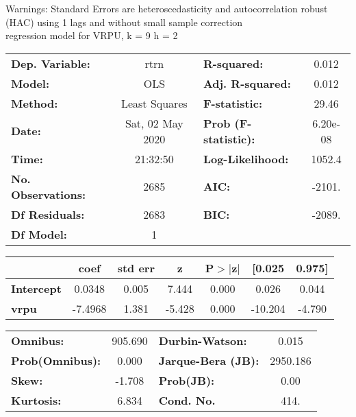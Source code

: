Warnings: \newline
 [1] Standard Errors are heteroscedasticity and autocorrelation robust (HAC) using 1 lags and without small sample correction\\ 

regression model for VRPU, k = 9 h = 2\begin{center}
\begin{tabular}{lclc}
\toprule
\textbf{Dep. Variable:}    &       rtrn       & \textbf{  R-squared:         } &     0.012   \\
\textbf{Model:}            &       OLS        & \textbf{  Adj. R-squared:    } &     0.012   \\
\textbf{Method:}           &  Least Squares   & \textbf{  F-statistic:       } &     29.46   \\
\textbf{Date:}             & Sat, 02 May 2020 & \textbf{  Prob (F-statistic):} &  6.20e-08   \\
\textbf{Time:}             &     21:32:50     & \textbf{  Log-Likelihood:    } &    1052.4   \\
\textbf{No. Observations:} &        2685      & \textbf{  AIC:               } &    -2101.   \\
\textbf{Df Residuals:}     &        2683      & \textbf{  BIC:               } &    -2089.   \\
\textbf{Df Model:}         &           1      & \textbf{                     } &             \\
\bottomrule
\end{tabular}
\begin{tabular}{lcccccc}
                   & \textbf{coef} & \textbf{std err} & \textbf{z} & \textbf{P$> |$z$|$} & \textbf{[0.025} & \textbf{0.975]}  \\
\midrule
\textbf{Intercept} &       0.0348  &        0.005     &     7.444  &         0.000        &        0.026    &        0.044     \\
\textbf{vrpu}      &      -7.4968  &        1.381     &    -5.428  &         0.000        &      -10.204    &       -4.790     \\
\bottomrule
\end{tabular}
\begin{tabular}{lclc}
\textbf{Omnibus:}       & 905.690 & \textbf{  Durbin-Watson:     } &    0.015  \\
\textbf{Prob(Omnibus):} &   0.000 & \textbf{  Jarque-Bera (JB):  } & 2950.186  \\
\textbf{Skew:}          &  -1.708 & \textbf{  Prob(JB):          } &     0.00  \\
\textbf{Kurtosis:}      &   6.834 & \textbf{  Cond. No.          } &     414.  \\
\bottomrule
\end{tabular}
\end{center}

